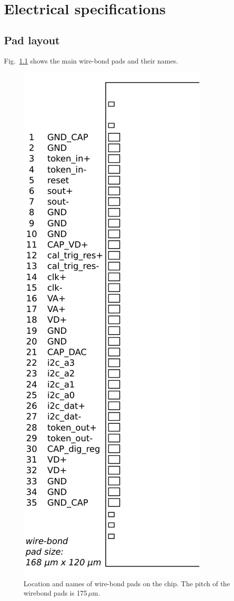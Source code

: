 \chapter{Electrical specifications}
\section{Pad layout}

Fig.~\ref{fig:ROCpadschematic} shows the main wire-bond pads and their names. 

\begin{figure}[hbtp]
	\begin{center}
	\includegraphics[width=.3\textwidth]{img/ROC_padschema.pdf}
	\end{center}
	\caption{Location and names of wire-bond pads on the chip. The pitch of the wirebond pads is 175\,$\mu$m.}
	\label{fig:ROCpadschematic}
\end{figure}

